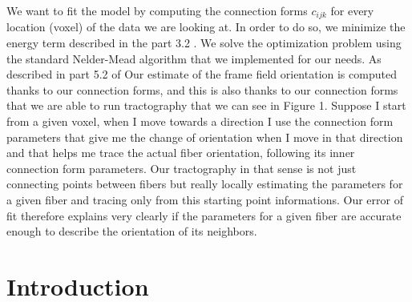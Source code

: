 We want to fit the model by computing the connection forms $c_{ijk}$ for every location (voxel) of the data we are looking at. In order to do so, we minimize the energy term described in the part 3.2 \cite{pami2015}. We solve the optimization problem using the standard Nelder-Mead algorithm that we implemented for our needs.
As described in part 5.2 of 
Our estimate of the frame field orientation is computed thanks to our connection forms, and this is also thanks to our connection forms that we are able to run tractography that we can see in Figure 1. Suppose I start from a given voxel, when I move towards a direction I use the connection form parameters that give me the change of orientation when I move in that direction and that helps me trace the actual fiber orientation, following its inner connection form parameters. Our tractography in that sense is not just connecting points between fibers but really locally estimating the parameters for a given fiber and tracing only from this starting point informations.
Our error of fit therefore explains very clearly if the parameters for a given fiber are accurate enough to describe the orientation of its neighbors.


\chapter{Introduction}

